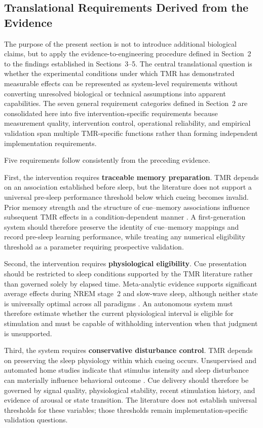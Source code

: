\subsection{Translational Requirements Derived from the Evidence}

The purpose of the present section is not to introduce additional biological
claims, but to apply the evidence-to-engineering procedure defined in
Section~2 to the findings established in Sections~3--5. The central
translational question is whether the experimental conditions under which TMR
has demonstrated measurable effects can be represented as system-level
requirements without converting unresolved biological or technical assumptions
into apparent capabilities.
The seven general requirement categories defined in Section~2 are consolidated
here into five intervention-specific requirements because measurement quality,
intervention control, operational reliability, and empirical validation span
multiple TMR-specific functions rather than forming independent implementation
requirements.

Five requirements follow consistently from the preceding evidence.

First, the intervention requires \textbf{traceable memory preparation}. TMR
depends on an association established before sleep, but the literature does not
support a universal pre-sleep performance threshold below which cueing becomes
invalid. Prior memory strength and the structure of cue--memory associations
influence subsequent TMR effects in a condition-dependent manner
\citep{creery2015priorlearning,cairney2016benefits}. A first-generation system
should therefore preserve the identity of cue--memory mappings and record
pre-sleep learning performance, while treating any numerical eligibility
threshold as a parameter requiring prospective validation.

Second, the intervention requires \textbf{physiological eligibility}. Cue
presentation should be restricted to sleep conditions supported by the TMR
literature rather than governed solely by elapsed time. Meta-analytic evidence
supports significant average effects during NREM stage~2 and slow-wave sleep,
although neither state is universally optimal across all paradigms
\citep{hu2020promoting}. An autonomous system must therefore estimate whether
the current physiological interval is eligible for stimulation and must be
capable of withholding intervention when that judgment is unsupported.

Third, the system requires \textbf{conservative disturbance control}. TMR
depends on preserving the sleep physiology within which cueing occurs.
Unsupervised and automated home studies indicate that stimulus intensity and
sleep disturbance can materially influence behavioral outcome
\citep{goldi2019home,whitmore2022improving}. Cue delivery should therefore be
governed by signal quality, physiological stability, recent stimulation
history, and evidence of arousal or state transition. The literature does not
establish universal thresholds for these variables; those thresholds remain
implementation-specific validation questions.

